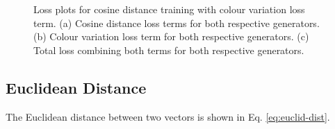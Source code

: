   \begin{figure}[!htbp]
    \centering
    \hfill
    \hfill
    \caption[Loss plots for cosine distance training with colour variation loss term]{Loss plots for cosine distance training with colour variation loss term. (a) Cosine distance loss terms for both respective generators. (b) Colour variation loss term for both respective generators. (c) Total loss combining both terms for both respective generators. }
    \label{fig:c3:cos-cos-losses}
  \end{figure}

\subsection{Euclidean Distance}

The Euclidean distance between two vectors is shown in Eq. \ref{eq:euclid-dist}.

